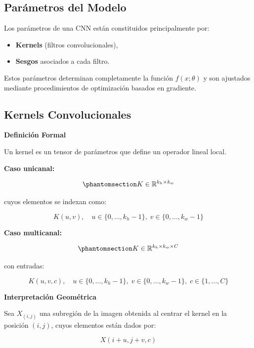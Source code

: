 \documentclass[
  spanish,
  us-letterpaper,
]{scrreprt}
\providecommand{\tightlist}{%
  \setlength{\itemsep}{0pt}\setlength{\parskip}{0pt}}
\theoremstyle{definition}
\theoremstyle{remark}
\begin{document}
\subsection{Parámetros del Modelo}\label{paruxe1metros-del-modelo}

Los parámetros de una CNN están constituidos principalmente por:

\begin{itemize}
\tightlist
\item
  \textbf{Kernels} (filtros convolucionales),
\item
  \textbf{Sesgos} asociados a cada filtro.
\end{itemize}

Estos parámetros determinan completamente la función \(f(x;\theta)\) y
son ajustados mediante procedimientos de optimización basados en
gradiente.

\subsection{Kernels Convolucionales}\label{kernels-convolucionales}

\textbf{Definición Formal}

Un kernel es un tensor de parámetros que define un operador lineal
local.

\textbf{Caso unicanal:}

\begin{equation}\phantomsection\label{eq-kernel-unicanal}{
K \in \mathbb{R}^{k_h \times k_w}
}\end{equation}

cuyos elementos se indexan como:

\[
K(u,v), \quad
u \in \{0,\dots,k_h-1\}, \;
v \in \{0,\dots,k_w-1\}
\]

\textbf{Caso multicanal:}

\begin{equation}\phantomsection\label{eq-kernel-multicanal}{
K \in \mathbb{R}^{k_h \times k_w \times C}
}\end{equation}

con entradas:

\[
K(u,v,c), \quad
u \in \{0,\dots,k_h-1\}, \;
v \in \{0,\dots,k_w-1\}, \;
c \in \{1,\dots,C\}
\]

\textbf{Interpretación Geométrica}

Sea \(X_{(i,j)}\) una subregión de la imagen obtenida al centrar el
kernel en la posición \((i,j)\), cuyos elementos están dados por:

\[
X(i+u, j+v, c)
\]
\end{document}

